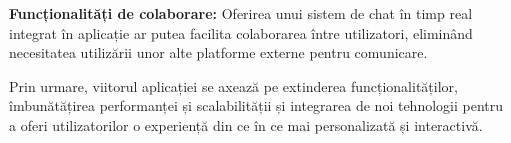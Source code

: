 \textbf{Funcționalități de colaborare:}
Oferirea unui sistem de chat în timp real integrat în aplicație ar putea facilita colaborarea între utilizatori, 
eliminând necesitatea utilizării unor alte platforme externe pentru comunicare.

Prin urmare, viitorul aplicației se axează pe extinderea funcționalităților, îmbunătățirea performanței și
scalabilității și integrarea de noi tehnologii pentru a oferi utilizatorilor o experiență din ce în ce
mai personalizată și interactivă.